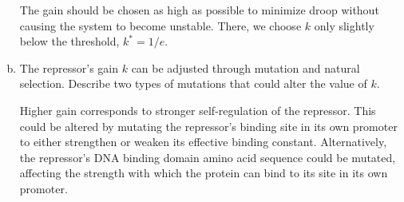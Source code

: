 \documentclass{article}
\begin{document}
\begin{enumerate}[a)]
{\color{red}
The gain should be chosen as high as possible to minimize droop without causing the system to become unstable. There, we choose $k$ only slightly below the threshold, $k^*=1/e$.

}

\item The repressor's gain $k$ can be adjusted through mutation and natural selection. Describe two types of mutations that could alter the value of $k$.\\

{\color{red}

Higher gain corresponds to stronger self-regulation of the repressor. This could be altered by mutating the repressor's binding site in its own promoter to either strengthen or weaken its effective binding constant. Alternatively, the repressor's DNA binding domain amino acid sequence could be mutated, affecting the strength with which the protein can bind to its site in its own promoter.

}
\end{enumerate}
\end{document}
